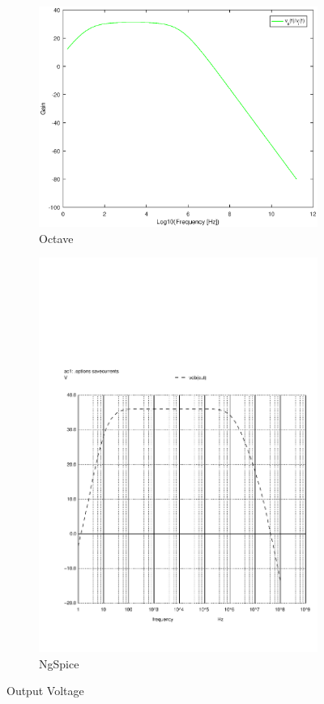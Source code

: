 \begin{figure}[H] 
\centering
\begin{subfigure}{0.4\textwidth}
\includegraphics[width=\textwidth]{Gain.eps}
\caption{Octave}
\label{ffirst}
\end{subfigure}
\begin{subfigure}{0.3\textwidth}
\includegraphics[width=\textwidth]{vo2f.pdf}
\caption{NgSpice}
\label{fsecond}
\end{subfigure}
\caption{Output Voltage}
\end{figure}

